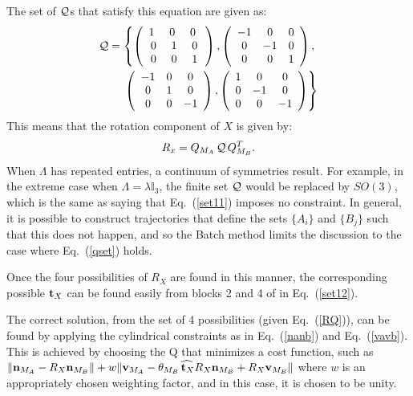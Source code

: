 \documentclass[twocolumn,10pt]{asme2ej}
\begin{document}
The set of ${\cal Q}$s that satisfy this equation are given as:
\begin{equation}
\begin{split}
{\cal Q} = \left\{ \left(\begin{array}{ccc}
1\,\, & 0 \,\, & 0 \,\, \\
0 & 1 & 0\\
0 & 0 & 1 \end{array}\right) , \left(\begin{array}{ccc}
-1 & 0 & 0 \\
0 & -1 & 0\\
0 & 0 & 1 \end{array}\right), \right.\\
\left. \left(\begin{array}{ccc}
-1 & 0 & 0 \\
0 & 1 & 0\\
0 & 0 & -1 \end{array}\right), \left(\begin{array}{ccc}
1 & 0 & 0 \\
0 & -1 & 0\\
0 & 0 & -1 \end{array}\right)\right\}
\end{split} 
\label{qset}
\end{equation}
This means that the rotation component of $X$ is given by:
\begin{equation}
R_x=Q_{M_A}\,{\cal Q}\,Q_{M_B}^T.
\label{RQ}\end{equation}
When $\Lambda$ has repeated entries, a continuum of symmetries result. For example, in the extreme case when $\Lambda = \lambda \mathbb{I}_3$, the
finite set ${\cal Q}$ would be replaced by $SO(3)$, which is the same as saying that Eq.~(\ref{set11}) imposes no constraint. In general, it is possible to construct trajectories that define the sets $\{A_i\}$ and $\{B_j\}$ such that this does not happen, and so the Batch method limits the discussion to the case where Eq.~(\ref{qset}) holds.

Once the four possibilities of $R_X$ are found in this manner, the corresponding possible ${\bf t}_X$ can be found easily from blocks 2 and 4 of in Eq.~(\ref{set12}).

The correct solution, from the set of 4 possibilities (given Eq.~(\ref{RQ})), can be found by applying the cylindrical constraints as in Eq.~(\ref{nanb}) and Eq.~(\ref{vavb}). This is achieved by choosing the Q %
that minimizes a cost function, such as $\| {\bf n}_{M_A}-R_X {\bf n}_{M_B} \|+w \| {\bf v}_{M_A} - \theta_{M_B} \widehat{\,{\bf t}_X} R_X {\bf n}_{M_B} + R_X {\bf v}_{M_B} \|$
where $w$ is an appropriately chosen weighting factor, and in this case, it is chosen to be unity.
\end{document}
